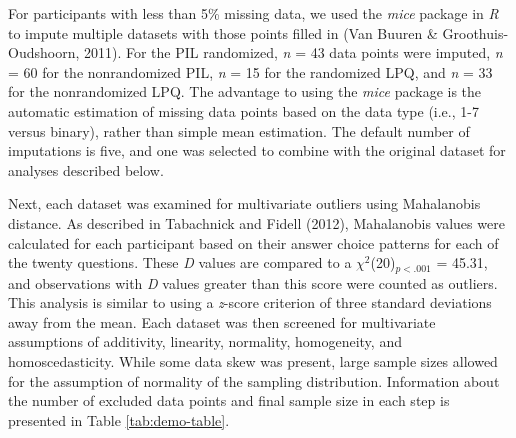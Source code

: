 \documentclass[english,man]{apa6}
\theoremstyle{definition}
\theoremstyle{definition}
\theoremstyle{definition}
\theoremstyle{remark}
\begin{document}
For participants with less than 5\% missing data, we used the
\emph{mice} package in \emph{R} to impute multiple datasets with those
points filled in (Van Buuren \& Groothuis-Oudshoorn, 2011). For the PIL
randomized, \emph{n} = 43 data points were imputed, \emph{n} = 60 for
the nonrandomized PIL, \emph{n} = 15 for the randomized LPQ, and
\emph{n} = 33 for the nonrandomized LPQ. The advantage to using the
\emph{mice} package is the automatic estimation of missing data points
based on the data type (i.e., 1-7 versus binary), rather than simple
mean estimation. The default number of imputations is five, and one was
selected to combine with the original dataset for analyses described
below.

Next, each dataset was examined for multivariate outliers using
Mahalanobis distance. As described in Tabachnick and Fidell (2012),
Mahalanobis values were calculated for each participant based on their
answer choice patterns for each of the twenty questions. These \emph{D}
values are compared to a \(\chi^2\)(20)\(_{p<.001}\) = 45.31, and
observations with \emph{D} values greater than this score were counted
as outliers. This analysis is similar to using a \emph{z}-score
criterion of three standard deviations away from the mean. Each dataset
was then screened for multivariate assumptions of additivity, linearity,
normality, homogeneity, and homoscedasticity. While some data skew was
present, large sample sizes allowed for the assumption of normality of
the sampling distribution. Information about the number of excluded data
points and final sample size in each step is presented in Table
\ref{tab:demo-table}.
\end{document}
